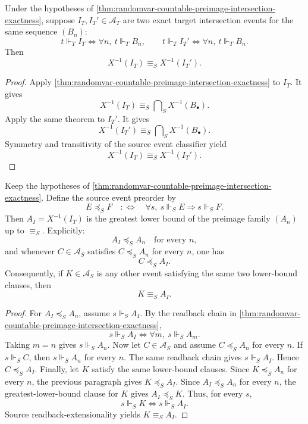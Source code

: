 \begin{corollary}
\label{cor:randomvar-countable-preimage-intersection-witness-determinacy}
Under the hypotheses of \autoref{thm:randomvar-countable-preimage-intersection-exactness}, suppose $I_T,I_T'\in\mathcal A_T$ are two exact
target intersection events for the same sequence $(B_n)$:
$$
t\Vdash_T I_T\Longleftrightarrow \forall n,\ t\Vdash_T B_n,
\qquad
t\Vdash_T I_T'\Longleftrightarrow \forall n,\ t\Vdash_T B_n.
$$
Then
$$
X^{-1}(I_T)\equiv_S X^{-1}(I_T').
$$
\end{corollary}
\begin{proof}
Apply \autoref{thm:randomvar-countable-preimage-intersection-exactness} to $I_T$. It gives
$$
X^{-1}(I_T)\equiv_S \bigcap\nolimits_S X^{-1}(B_\bullet).
$$
Apply the same theorem to $I_T'$. It gives
$$
X^{-1}(I_T')\equiv_S \bigcap\nolimits_S X^{-1}(B_\bullet).
$$
Symmetry and transitivity of the source event classifier yield
$$
X^{-1}(I_T)\equiv_S X^{-1}(I_T').
$$
\end{proof}

\begin{proposition}
\label{prop:randomvar-countable-preimage-intersection-glb-exactness}
Keep the hypotheses of \autoref{thm:randomvar-countable-preimage-intersection-exactness}. Define the source event preorder by
$$
E\preceq_S F
\quad:\Longleftrightarrow\quad
\forall s,\ s\Vdash_S E\Rightarrow s\Vdash_S F.
$$
Then $A_I=X^{-1}(I_T)$ is the greatest lower bound of the preimage family $(A_n)$ up to
$\equiv_S$. Explicitly:
$$
A_I\preceq_S A_n\quad\text{for every }n,
$$
and whenever $C\in\mathcal A_S$ satisfies $C\preceq_S A_n$ for every $n$, one has
$$
C\preceq_S A_I.
$$
Consequently, if $K\in\mathcal A_S$ is any other event satisfying the same two lower-bound
clauses, then
$$
K\equiv_S A_I.
$$
\end{proposition}
\begin{proof}
For $A_I\preceq_S A_n$, assume $s\Vdash_S A_I$. By the readback chain in \autoref{thm:randomvar-countable-preimage-intersection-exactness},
$$
s\Vdash_S A_I
\Longleftrightarrow
\forall m,\ s\Vdash_S A_m.
$$
Taking $m=n$ gives $s\Vdash_S A_n$.
Now let $C\in\mathcal A_S$ and assume $C\preceq_S A_n$ for every $n$. If $s\Vdash_S C$, then
$s\Vdash_S A_n$ for every $n$. The same readback chain gives $s\Vdash_S A_I$. Hence
$C\preceq_S A_I$.
Finally, let $K$ satisfy the same lower-bound clauses. Since $K\preceq_S A_n$ for every $n$,
the previous paragraph gives $K\preceq_S A_I$. Since $A_I\preceq_S A_n$ for every $n$, the
greatest-lower-bound clause for $K$ gives $A_I\preceq_S K$. Thus, for every $s$,
$$
s\Vdash_S K\Longleftrightarrow s\Vdash_S A_I.
$$
Source readback-extensionality yields $K\equiv_S A_I$.
\end{proof}

